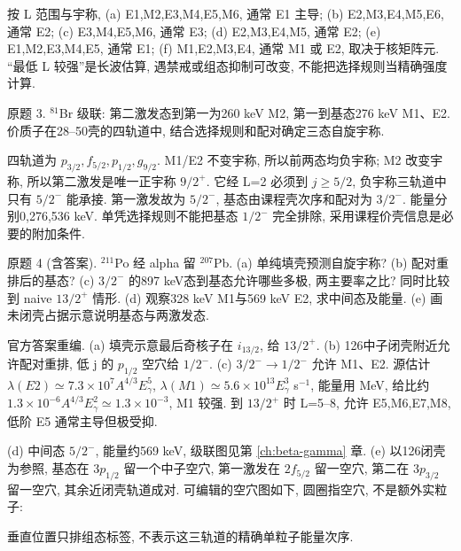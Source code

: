 \begin{solution}
按 L 范围与宇称, (a) E1,M2,E3,M4,E5,M6, 通常 E1 主导; (b) E2,M3,E4,M5,E6, 通常 E2; (c) E3,M4,E5,M6, 通常 E3; (d) E2,M3,E4,M5, 通常 E2; (e) E1,M2,E3,M4,E5, 通常 E1; (f) M1,E2,M3,E4, 通常 M1 或 E2, 取决于核矩阵元. ``最低 L 较强''是长波估算, 遇禁戒或组态抑制可改变, 不能把选择规则当精确强度计算.
\end{solution}
\begin{exercise}\label{ex:2202-8-3}
原题 3. $^{81}$Br 级联: 第二激发态到第一为260 keV M2, 第一到基态276 keV M1、E2. 价质子在28--50壳的四轨道中, 结合选择规则和配对确定三态自旋宇称.
\end{exercise}
\begin{solution}
四轨道为 $p_{3/2},f_{5/2},p_{1/2},g_{9/2}$. M1/E2 不变宇称, 所以前两态均负宇称; M2 改变宇称, 所以第二激发是唯一正宇称 $9/2^+$. 它经 L=2 必须到 $j\ge5/2$, 负宇称三轨道中只有 $5/2^-$ 能承接. 第一激发故为 $5/2^-$, 基态由课程壳次序和配对为 $3/2^-$. 能量分别0,276,536 keV. 单凭选择规则不能把基态 $1/2^-$ 完全排除, 采用课程价壳信息是必要的附加条件.
\end{solution}
\begin{exercise}\label{ex:2202-8-4}
原题 4 (含答案). $^{211}$Po 经 alpha 留 $^{207}$Pb. (a) 单纯填壳预测自旋宇称? (b) 配对重排后的基态? (c) $3/2^-$ 的897 keV态到基态允许哪些多极, 两主要率之比? 同时比较到 naive $13/2^+$ 情形. (d) 观察328 keV M1与569 keV E2, 求中间态及能量. (e) 画未闭壳占据示意说明基态与两激发态.
\end{exercise}
\begin{solution}
官方答案重编. (a) 填壳示意最后奇核子在 $i_{13/2}$, 给 $13/2^+$. (b) 126中子闭壳附近允许配对重排, 低 j 的 $p_{1/2}$ 空穴给 $1/2^-$. (c) $3/2^-\to1/2^-$ 允许 M1、E2. 源估计 $\lambda(E2)\simeq7.3\times10^7A^{4/3}E_\gamma^5$, $\lambda(M1)\simeq5.6\times10^{13}E_\gamma^3$ s$^{-1}$, 能量用 MeV, 给比约 $1.3\times10^{-6}A^{4/3}E_\gamma^2\simeq1.3\times10^{-3}$, M1 较强. 到 $13/2^+$ 时 L=5--8, 允许 E5,M6,E7,M8, 低阶 E5 通常主导但极受抑.

(d) 中间态 $5/2^-$, 能量约569 keV, 级联图见第 \ref{ch:beta-gamma} 章. (e) 以126闭壳为参照, 基态在 $3p_{1/2}$ 留一个中子空穴, 第一激发在 $2f_{5/2}$ 留一空穴, 第二在 $3p_{3/2}$ 留一空穴, 其余近闭壳轨道成对. 可编辑的空穴图如下, 圆圈指空穴, 不是额外实粒子:
\begin{center}\end{center}
垂直位置只排组态标签, 不表示这三轨道的精确单粒子能量次序.
\end{solution}
